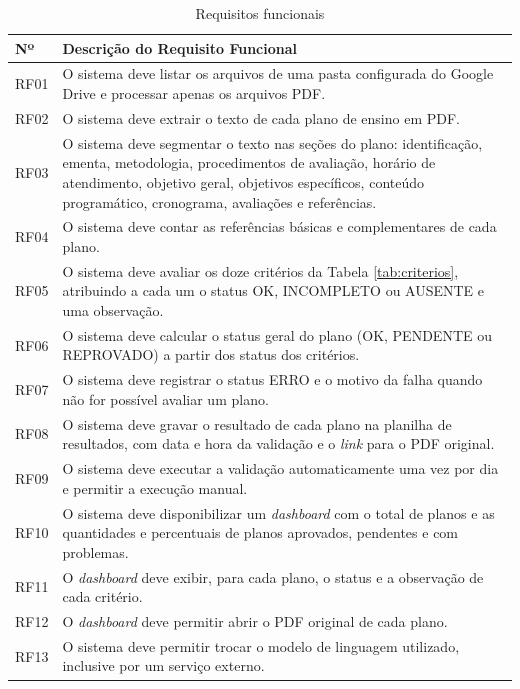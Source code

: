 \begin{table}[H]
\centering
\caption{Requisitos funcionais}
\label{tab:rf}
\footnotesize
\begin{tabular}{@{}L{1.1cm}L{13.3cm}@{}}
\toprule
{}
\textbf{Nº} & \textbf{Descrição do Requisito Funcional} \\ \midrule
RF01 & O sistema deve listar os arquivos de uma pasta configurada do Google Drive e processar apenas os arquivos PDF. \\
RF02 & O sistema deve extrair o texto de cada plano de ensino em PDF. \\
RF03 & O sistema deve segmentar o texto nas seções do plano: identificação, ementa, metodologia, procedimentos de avaliação, horário de atendimento, objetivo geral, objetivos específicos, conteúdo programático, cronograma, avaliações e referências. \\
RF04 & O sistema deve contar as referências básicas e complementares de cada plano. \\
RF05 & O sistema deve avaliar os doze critérios da Tabela \ref{tab:criterios}, atribuindo a cada um o status OK, INCOMPLETO ou AUSENTE e uma observação. \\
RF06 & O sistema deve calcular o status geral do plano (OK, PENDENTE ou REPROVADO) a partir dos status dos critérios. \\
RF07 & O sistema deve registrar o status ERRO e o motivo da falha quando não for possível avaliar um plano. \\
RF08 & O sistema deve gravar o resultado de cada plano na planilha de resultados, com data e hora da validação e o \textit{link} para o PDF original. \\
RF09 & O sistema deve executar a validação automaticamente uma vez por dia e permitir a execução manual. \\
RF10 & O sistema deve disponibilizar um \textit{dashboard} com o total de planos e as quantidades e percentuais de planos aprovados, pendentes e com problemas. \\
RF11 & O \textit{dashboard} deve exibir, para cada plano, o status e a observação de cada critério. \\
RF12 & O \textit{dashboard} deve permitir abrir o PDF original de cada plano. \\
RF13 & O sistema deve permitir trocar o modelo de linguagem utilizado, inclusive por um serviço externo. \\ \bottomrule
\end{tabular}
\end{table}

